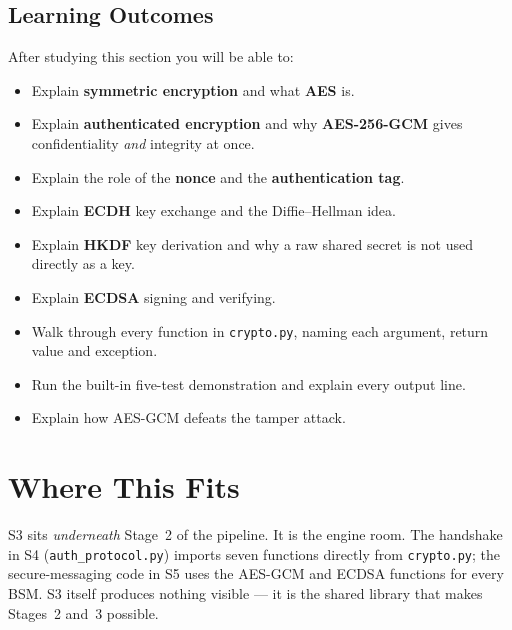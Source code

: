 \documentclass[11pt,a4paper]{article}
\begin{document}
\subsection*{Learning Outcomes}
After studying this section you will be able to:
\begin{itemize}
  \item Explain \textbf{symmetric encryption} and what \textbf{AES} is.
  \item Explain \textbf{authenticated encryption} and why \textbf{AES-256-GCM}
        gives confidentiality \emph{and} integrity at once.
  \item Explain the role of the \textbf{nonce} and the \textbf{authentication
        tag}.
  \item Explain \textbf{ECDH} key exchange and the Diffie--Hellman idea.
  \item Explain \textbf{HKDF} key derivation and why a raw shared secret is not
        used directly as a key.
  \item Explain \textbf{ECDSA} signing and verifying.
  \item Walk through every function in \texttt{crypto.py}, naming each argument,
        return value and exception.
  \item Run the built-in five-test demonstration and explain every output line.
  \item Explain how AES-GCM defeats the tamper attack.
\end{itemize}

\section{Where This Fits}

S3 sits \emph{underneath} Stage~2 of the pipeline. It is the engine room. The
handshake in S4 (\texttt{auth\_protocol.py}) imports seven functions directly
from \texttt{crypto.py}; the secure-messaging code in S5 uses the AES-GCM and
ECDSA functions for every BSM. S3 itself produces nothing visible --- it is the
shared library that makes Stages~2 and~3 possible.
\end{document}
